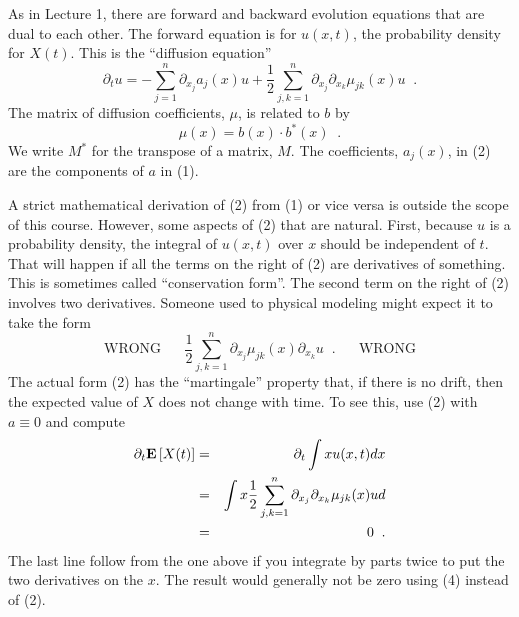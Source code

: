 As in Lecture 1, there are forward and backward evolution equations that
are dual to each other.  The forward equation is for $u(x,t)$, the probability
density for $X(t)$.  This is the ``diffusion equation''
\begin{equation}
\partial_t u = - \sum_{j=1}^n \partial_{x_j} a_j(x) u
  + \frac{1}{2} \sum_{j,k = 1}^n \partial_{x_j}\partial_{x_k}\mu_{jk}(x) u
             \;\; .
\end{equation}
The matrix of diffusion coefficients, $\mu$, is related to $b$ by
\begin{equation}
\mu(x) = b(x)\cdot b^*(x) \;\; .
\end{equation}
We write $M^*$ for the transpose of a matrix, $M$.
The coefficients, $a_j(x)$, in (2) are the components of $a$ in (1).

A strict mathematical derivation of (2) from (1) or vice versa is outside
the scope of this course.  However, some aspects of (2) that are natural.
First, because $u$ is a probability density, the integral of $u(x,t)$ over
$x$ should be independent of $t$.  That will happen if all the terms on the
right of (2) are derivatives of something.  This is sometimes called
``conservation form''.  The second term on the right of (2) involves
two derivatives.  Someone used to physical modeling might expect it to
take the form
\begin{equation}
\mbox{WRONG} \;\;\;\;\;\;
 \frac{1}{2} \sum_{j,k = 1}^n \partial_{x_j}\mu_{jk}(x)\partial_{x_k} u
                            \;\; .
\;\;\;\;\;\; \mbox{WRONG}
\end{equation}
The actual form (2) has the ``martingale'' property that, if there is no
drift, then the expected value of $X$ does not change with time.  To see
this, use (2) with $a \equiv 0$ and compute
\begin{eqnarray*}
\partial_t \mbox{\bf E}\left[ X(t) \right]
& = &
   \partial_t \int x u(x,t)dx \\
& = &
   \int x  \frac{1}{2}
         \sum_{j,k = 1}^n \partial_{x_j}\partial_{x_k}\mu_{jk}(x) u d \\
& = & 0 \;\; .
\end{eqnarray*}
The last line follow from the one above if you integrate by parts twice
to put the two derivatives on the $x$.  The result would generally not be
zero using (4) instead of (2).

